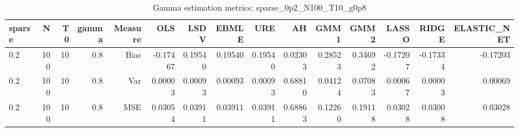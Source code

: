 \begin{table}[!htbp]\centering
\caption{Gamma estimation metrics: sparse_0p2_N100_T10_g0p8}
\label{tab:table1_sparse_0p2_N100_T10_g0p8}
\begin{tabular}{lrrrrrrrrrrrrrr}
\hline
sparse & N & T0 & gamma & Measure & OLS & LSDV & EBMLE & URE & AH & GMM1 & GMM2 & LASSO & RIDGE & ELASTIC_NET \\
\hline
0.2 & 100 & 10 & 0.8 & Bias & -0.17467 & 0.19540 & 0.19540 & 0.19540 & 0.02303 & 0.28523 & 0.34692 & -0.17207 & -0.17334 & -0.17203 \\
0.2 & 100 & 10 & 0.8 & Var & 0.00003 & 0.00093 & 0.00093 & 0.00093 & 0.68810 & 0.04124 & 0.07083 & 0.00067 & 0.00003 & 0.00069 \\
0.2 & 100 & 10 & 0.8 & MSE & 0.03054 & 0.03911 & 0.03911 & 0.03911 & 0.68863 & 0.12260 & 0.19118 & 0.03028 & 0.03008 & 0.03028 \\
\hline
\end{tabular}
\end{table}

